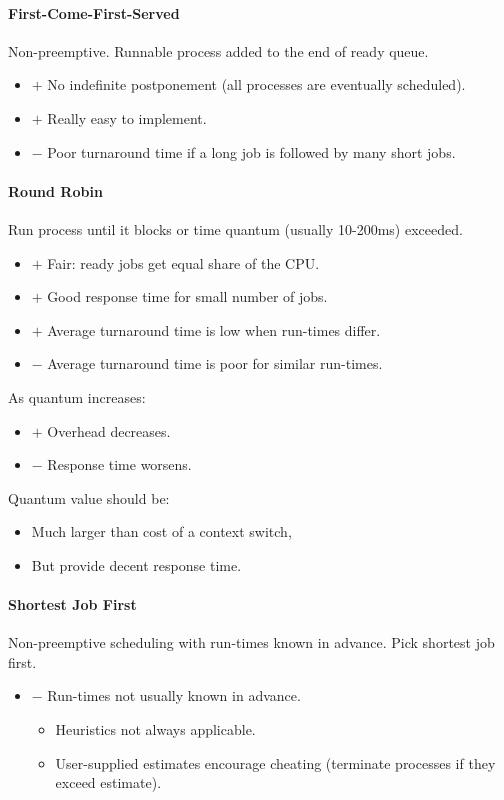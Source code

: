 \documentclass[twocolumn,english]{article}
\begin{document}
\paragraph{First-Come-First-Served}

Non-preemptive. Runnable process added to the end of ready queue. 
\begin{itemize}
\item $+$ No indefinite postponement (all processes are eventually scheduled). 
\item $+$ Really easy to implement. 
\item $-$ Poor turnaround time if a long job is followed by many short
jobs. 
\end{itemize}

\paragraph{Round Robin}

Run process until it blocks or time quantum (usually 10-200ms) exceeded. 
\begin{itemize}
\item $+$ Fair: ready jobs get equal share of the CPU. 
\item $+$ Good response time for small number of jobs. 
\item $+$ Average turnaround time is low when run-times differ. 
\item $-$ Average turnaround time is poor for similar run-times. 
\end{itemize}
As quantum increases: 
\begin{itemize}
\item $+$ Overhead decreases. 
\item $-$ Response time worsens. 
\end{itemize}
Quantum value should be: 
\begin{itemize}
\item Much larger than cost of a context switch, 
\item But provide decent response time. 
\end{itemize}

\paragraph{Shortest Job First}

Non-preemptive scheduling with run-times known in advance. Pick shortest
job first. 
\begin{itemize}
\item $-$ Run-times not usually known in advance. 

\begin{itemize}
\item Heuristics not always applicable. 
\item User-supplied estimates encourage cheating (terminate processes if
they exceed estimate). 
\end{itemize}
\end{itemize}
\end{document}
